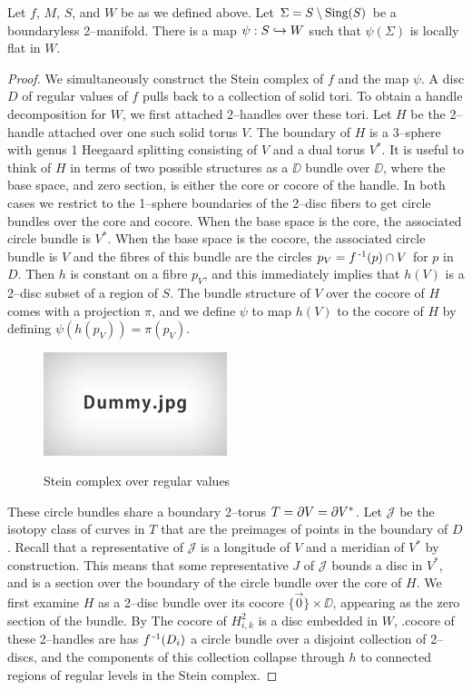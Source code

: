 \begin{theorem}
	Let $f$, $M$, $S$, and $W$ be as we defined above.
	Let $\Sigma = S\setminus\textrm{Sing}(S)$ be a boundaryless 2--manifold.
	There is a map $\psi:S\hookrightarrow W$ such that $\psi(\Sigma)$ is locally flat in $W$.
\end{theorem}

\begin{proof}
	We simultaneously construct the Stein complex of $f$ and the map $\psi$.
	A disc $D$ of regular values of $f$ pulls back to a collection of solid tori.
	To obtain a handle decomposition for $W$, we first attached 2--handles over these tori.
	Let $H$ be the 2--handle attached over one such solid torus $V$.
	The boundary of $H$ is a 3--sphere with genus 1 Heegaard splitting consisting of $V$ and a dual torus $V^*$.
	It is useful to think of $H$ in terms of two possible structures as a $\DD$ bundle over $\DD$, where the base space, and zero section, is either the core or cocore of the handle.
	In both cases we restrict to the 1--sphere boundaries of the 2--disc fibers to get circle bundles over the core and cocore.
	When the base space is the core, the associated circle bundle is $V^*$.
	When the base space is the cocore, the associated circle bundle is $V$ and the fibres of this bundle are the circles $p_V = f^{\,\text{-}1}(p)\cap V$ for $p$ in $D$.
	Then $h$ is constant on a fibre $p_V$, and this immediately implies that $h(V)$ is a 2--disc subset of a region of $S$.
	The bundle structure of $V$ over the cocore of $H$ comes with a projection $\pi$, and we define $\psi$ to map $h(V)$ to the cocore of $H$ by defining $\psi(h(p_V))=\pi(p_V)$.
		
	\begin{figure}
		\centering
		\captionsetup{justification=centering}
		\caption{Stein complex over regular values}
		\includegraphics[height=3cm]{figures/dummy.jpg}
		\label{fig:regstein}
	\end{figure}
										
									These circle bundles share a boundary 2--torus $T=\partial V=\partial V^*$.
									Let $\mathcal{J}$ be the isotopy class of curves in $T$ that are the preimages of points in the boundary of $D$.
									Recall that a representative of $\mathcal{J}$ is a longitude of $V$ and a meridian of $V^*$ by construction.
									This means that some representative $J$ of $\mathcal{J}$ bounds a disc in $V^*$, and is a section over the boundary of the circle bundle over the core of $H$.
									We first examine $H$ as a 2--disc bundle over its cocore $\{\vec{0}\}\times\DD$, appearing as the zero section of the bundle.
									By 
									The cocore of $H_{i,k}^2$ is a disc embedded in $W$, .cocore of these 2--handles are 
									has $f^{\,\text{-}1}(D_i)$ a circle bundle over a disjoint collection of 2--discs, and the components of this collection collapse through $h$ to connected regions of regular levels in the Stein complex.
		

\end{proof}
